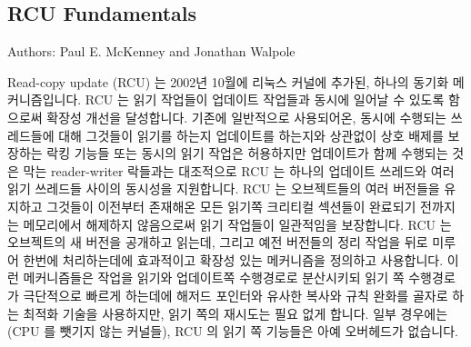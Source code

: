 
\subsection{RCU Fundamentals}
\label{sec:defer:RCU Fundamentals}

Authors: Paul E. McKenney and Jonathan Walpole

Read-copy update (RCU) 는 2002년 10월에 리눅스 커널에 추가된, 하나의 동기화
메커니즘입니다.
RCU 는 읽기 작업들이 업데이트 작업들과 동시에 일어날 수 있도록 함으로써 확장성
개선을 달성합니다.
기존에 일반적으로 사용되어온, 동시에 수행되는 쓰레드들에 대해 그것들이 읽기를
하는지 업데이트를 하는지와 상관없이 상호 배제를 보장하는 락킹 기능들 또는
동시의 읽기 작업은 허용하지만 업데이트가 함께 수행되는 것은 막는 reader-writer
락들과는 대조적으로 RCU 는 하나의 업데이트 쓰레드와 여러 읽기 쓰레드들 사이의
동시성을 지원합니다.
RCU 는 오브젝트들의 여러 버전들을 유지하고 그것들이 이전부터 존재해온 모든
읽기쪽 크리티컬 섹션들이 완료되기 전까지는 메모리에서 해제하지 않음으로써 읽기
작업들이 일관적임을 보장합니다.
RCU 는 오브젝트의 새 버전을 공개하고 읽는데, 그리고 예전 버전들의 정리 작업을
뒤로 미루어 한번에 처리하는데에 효과적이고 확장성 있는 메커니즘을 정의하고
사용합니다.
이런 메커니즘들은 작업을 읽기와 업데이트쪽 수행경로로 분산시키되 읽기 쪽
수행경로가 극단적으로 빠르게 하는데에 해저드 포인터와 유사한 복사와 규칙 완화를
골자로 하는 최적화 기술을 사용하지만, 읽기 쪽의 재시도는 필요 없게 합니다.
일부 경우에는 (CPU 를 뺏기지 않는 커널들), RCU 의 읽기 쪽 기능들은 아예
오버헤드가 없습니다.

